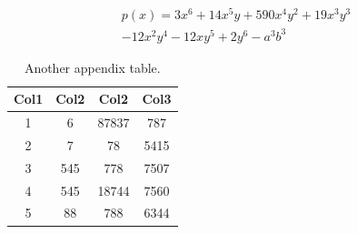 \documentclass[a4paper,12pt,oneside]{report}
\begin{document}
\begin{appendices}
\begin{align*}
p(x) = 3x^6 + 14x^5y + 590x^4y^2 + 19x^3y^3\\ 
- 12x^2y^4 - 12xy^5 + 2y^6 - a^3b^3
\end{align*}

\begin{table}[htb]
\caption{\centering Another appendix table.}
\label{table:5}
\centering
\begin{tabular}{|c c c c|} 
 \hline
 Col1 & Col2 & Col2 & Col3 \\ [0.5ex] 
 \hline\hline
 1 & 6 & 87837 & 787 \\ 
 2 & 7 & 78 & 5415 \\
 3 & 545 & 778 & 7507 \\
 4 & 545 & 18744 & 7560 \\
 5 & 88 & 788 & 6344 \\ [1ex] 
 \hline
\end{tabular}
\end{table}

\end{appendices}

\printindex

\end{document}
